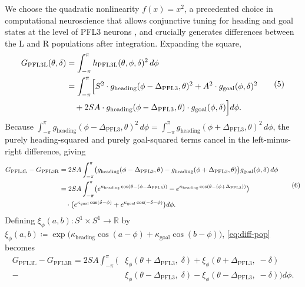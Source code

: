 \documentclass[11pt, a4paper]{article}
\newcommand{\kh}{\kappa_{\mathrm{heading}}}
\newcommand{\kg}{\kappa_{\mathrm{goal}}}
\newcommand{\Dp}{\Delta_{\mathrm{PFL3}}}
\begin{document}
We choose the quadratic nonlinearity $f(x) = x^2$, a precedented choice in
computational neuroscience that allows conjunctive tuning for heading and goal
states at the level of PFL3 neurons \cite{hennequin2018}, and crucially
generates differences between the L and R populations after integration.
Expanding the square,
%
\begin{equation}
\label{eq:G-expanded}
\begin{aligned}
G_{\mathrm{PFL3L}}(\theta, \delta)
  &= \int_{-\pi}^{\pi} h_{\mathrm{PFL3L}}(\theta, \phi, \delta)^2\,d\phi \\
  &= \int_{-\pi}^{\pi}
     \Bigl[
       S^2 \cdot g_{\mathrm{heading}}(\phi - \Dp,\theta)^2
     + A^2 \cdot g_{\mathrm{goal}}(\phi,\delta)^2\notag\\
  &\quad+ 2SA \cdot g_{\mathrm{heading}}(\phi - \Dp,\theta)
             \cdot g_{\mathrm{goal}}(\phi,\delta)
     \Bigr] d\phi.
\end{aligned}
\tag{5}
\end{equation}
%
Because $\int_{-\pi}^{\pi} g_{\mathrm{heading}}(\phi - \Dp, \theta)^2\,d\phi
= \int_{-\pi}^{\pi} g_{\mathrm{heading}}(\phi + \Dp, \theta)^2\,d\phi$, the
purely heading-squared and purely goal-squared terms cancel in the
left-minus-right difference, giving
%
\begin{equation}
\label{eq:diff-pop}
\begin{aligned}
G_{\mathrm{PFL3L}} - G_{\mathrm{PFL3R}}
  &= 2SA \int_{-\pi}^{\pi}
     \bigl(
       g_{\mathrm{heading}}(\phi - \Dp, \theta)
     - g_{\mathrm{heading}}(\phi + \Dp, \theta)
     \bigr)
     g_{\mathrm{goal}}(\phi, \delta)\,d\phi \\
  &= 2SA \int_{-\pi}^{\pi}
     \bigl(
       e^{\kh\cos(\theta - (\phi - \Dp))}
     - e^{\kh\cos(\theta - (\phi + \Dp))}
     \bigr)\notag\\
     &\quad\cdot\bigl(
       e^{\kg\cos(\delta - \phi)}
     + e^{\kg\cos(-\delta - \phi)}
     \bigr)d\phi.
\end{aligned}
\tag{6}
\end{equation}
%
Defining $\xi_\phi(a, b) \colon S^1 \times S^1 \to \mathbb{R}$
by $\xi_\phi(a,b) \coloneqq \exp\bigl(
  \kh\cos(a - \phi) + \kg\cos(b - \phi)\bigr)$, \cref{eq:diff-pop} becomes
%
\begin{equation}
\label{eq:xi-form}
\begin{aligned}
G_{\mathrm{PFL3L}} - G_{\mathrm{PFL3R}}
  = 2SA \int_{-\pi}^{\pi} \bigl(
    &\xi_\phi(\theta + \Dp,\; \delta)
   + \xi_\phi(\theta + \Dp,\; -\delta) \\
   -&\xi_\phi(\theta - \Dp,\; \delta)
   - \xi_\phi(\theta - \Dp,\; -\delta)
  \bigr) d\phi.
\end{aligned}
\tag{7}
\end{equation}
\end{document}
